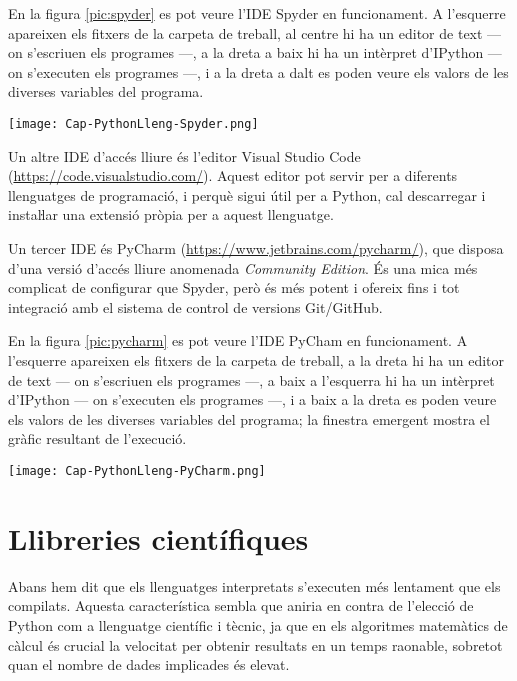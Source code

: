 En la figura \vref{pic:spyder} es pot veure l'IDE Spyder en funcionament. A l'esquerre apareixen els fitxers de la carpeta de treball, al centre hi ha un editor de text --- on s'escriuen els programes ---, a la dreta a baix hi ha un intèrpret d'IPython --- on s'executen els programes ---, i a la dreta a  dalt es poden veure els valors de les diverses variables del programa.

\begin{center}
	\centering
	\texttt{[image: Cap-PythonLleng-Spyder.png]}
	\label{pic:spyder}
\end{center}

Un altre IDE d'accés lliure és l'editor  Visual Studio Code (\href{https://code.visualstudio.com/}{https://code.visualstudio.com/}). Aquest editor pot servir per a diferents llenguatges de programació, i perquè sigui útil per a Python, cal descarregar i instaŀlar una extensió pròpia per a aquest llenguatge.

Un tercer IDE és PyCharm (\href{https://www.jetbrains.com/pycharm/}{https://www.jetbrains.com/pycharm/}), que disposa d'una versió d'accés lliure anomenada \textit{Community Edition}. És una mica més complicat de configurar que Spyder, però és més potent i ofereix fins i tot integració amb el sistema de control de versions Git/GitHub.

	
En la figura \vref{pic:pycharm} es pot veure l'IDE PyCham en funcionament. A l'esquerre apareixen els fitxers de la carpeta de treball, a la dreta hi ha un editor de text --- on s'escriuen els programes ---, a baix a l'esquerra  hi ha un intèrpret d'IPython --- on s'executen els programes ---, i a baix a la dreta es poden veure els valors de les diverses variables del programa; la finestra emergent mostra el gràfic resultant de l'execució.

\begin{center}
	\centering
	\texttt{[image: Cap-PythonLleng-PyCharm.png]}
	\label{pic:pycharm}
\end{center}


\section{Llibreries científiques}\label{sec:python-libs}

Abans hem dit que els llenguatges interpretats s'executen més lentament que els compilats. Aquesta característica sembla que aniria en contra de l'elecció de Python com a llenguatge científic i tècnic, ja que en els algoritmes matemàtics de càlcul és crucial la velocitat per obtenir resultats en un temps raonable, sobretot quan el nombre de dades implicades és elevat.

